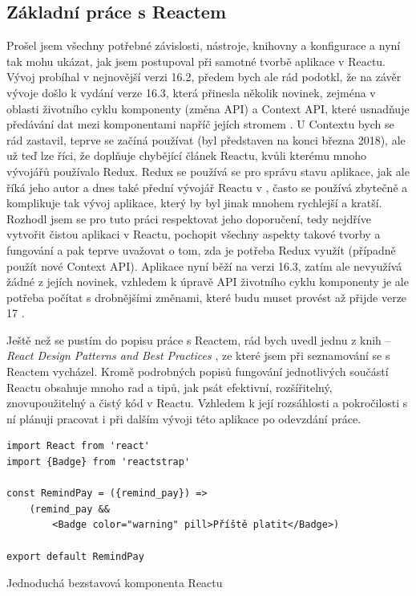     \subsection{Základní práce s Reactem}\label{sec:zakladniPraceSReactem}
    Prošel jsem všechny potřebné závislosti, nástroje, knihovny a konfigurace a nyní tak mohu ukázat, jak jsem postupoval při samotné tvorbě aplikace v Reactu. Vývoj probíhal v nejnovější verzi 16.2, předem bych ale rád podotkl, že na závěr vývoje došlo k vydání verze 16.3, která přinesla několik novinek, zejména v oblasti životního cyklu komponenty (změna API) a Context API, které usnadňuje předávání dat mezi komponentami napříč jejích stromem \cite{react-blog1}. U Contextu bych se rád zastavil, teprve se začíná používat (byl představen na konci března 2018), ale už teď lze říci, že doplňuje chybějící článek Reactu, kvůli kterému mnoho vývojářů používalo Redux. Redux se používá se pro správu stavu aplikace, jak ale říká jeho autor a dnes také přední vývojář Reactu v \cite{react-blog3}, často se používá zbytečně a komplikuje tak vývoj aplikace, který by byl jinak mnohem rychlejší a kratší. Rozhodl jsem se pro tuto práci respektovat jeho doporučení, tedy nejdříve vytvořit čistou aplikaci v Reactu, pochopit všechny aspekty takové tvorby a fungování a pak teprve uvažovat o tom, zda je potřeba Redux využít (případně použít nové Context API). Aplikace nyní běží na verzi 16.3, zatím ale nevyužívá žádné z jejích novinek, vzhledem k úpravě API životního cyklu komponenty je ale potřeba počítat s drobnějšími změnami, které budu muset provést až přijde verze 17 \cite{react-blog2}.
    
    Ještě než se pustím do popisu práce s Reactem, rád bych uvedl jednu z knih -- \textit{React Design Patterns and Best Practices} \cite{react-kniha}, ze které jsem při seznamování se s Reactem vycházel. Kromě podrobných popisů fungování jednotlivých součástí Reactu obsahuje mnoho rad a tipů, jak psát efektivní, rozšířitelný, znovupoužitelný a čistý kód v Reactu. Vzhledem k její rozsáhlosti a pokročilosti s ní plánuji pracovat i při dalším vývoji této aplikace po odevzdání práce.
    
    \begin{listing}[ht]
    	\begin{verbatim}
import React from 'react'
import {Badge} from 'reactstrap'

const RemindPay = ({remind_pay}) =>
    (remind_pay && 
        <Badge color="warning" pill>Příště platit</Badge>)

export default RemindPay
    	\end{verbatim}
    	\caption{Jednoduchá bezstavová komponenta Reactu}\label{lst:react1}
    \end{listing}
    
